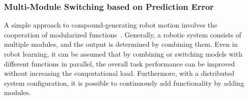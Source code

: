 \subsubsection{Multi-Module Switching based on Prediction Error}

A simple approach to compound-generating robot motion involves the cooperation of modularized functions~\cite{Haruno2001,Wolpert1998}. Generally, a robotic system consists of multiple modules, and the output is determined by combining them. Even in robot learning, it can be assumed that by combining or switching models with different functions in parallel, the overall task performance can be improved without increasing the computational load. Furthermore, with a distributed system configuration, it is possible to continuously add functionality by adding modules.


